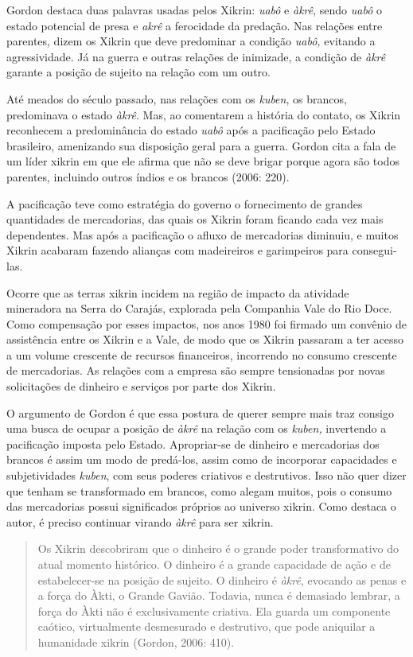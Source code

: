 Gordon destaca duas palavras usadas pelos Xikrin: \emph{uabô} e
\emph{àkrê}, sendo \emph{uabô} o estado potencial de presa e \emph{akrê}
a ferocidade da predação. Nas relações entre parentes, dizem os Xikrin
que deve predominar a condição \emph{uabô,} evitando a agressividade. Já
na guerra e outras relações de inimizade, a condição de \emph{àkrê}
garante a posição de sujeito na relação com um outro.

Até meados do século passado, nas relações com os \emph{kuben}, os
brancos, predominava o estado \emph{àkrê}. Mas, ao comentarem a história
do contato, os Xikrin reconhecem a predominância do estado \emph{uabô}
após a pacificação pelo Estado brasileiro, amenizando sua disposição
geral para a guerra. Gordon cita a fala de um líder xikrin em que ele
afirma que não se deve brigar porque agora são todos parentes, incluindo
outros índios e os brancos (2006: 220).

A pacificação teve como estratégia do governo o fornecimento de grandes
quantidades de mercadorias, das quais os Xikrin foram ficando cada vez
mais dependentes. Mas após a pacificação o afluxo de mercadorias
diminuiu, e muitos Xikrin acabaram fazendo alianças com madeireiros e
garimpeiros para consegui-las.

Ocorre que as terras xikrin incidem na região de impacto da atividade
mineradora na Serra do Carajás, explorada pela Companhia Vale do Rio
Doce. Como compensação por esses impactos, nos anos 1980 foi firmado um
convênio de assistência entre os Xikrin e a Vale, de modo que os Xikrin
passaram a ter acesso a um volume crescente de recursos financeiros,
incorrendo no consumo crescente de mercadorias. As relações com a
empresa são sempre tensionadas por novas solicitações de dinheiro e
serviços por parte dos Xikrin.

O argumento de Gordon é que essa postura de querer sempre mais traz
consigo uma busca de ocupar a posição de \emph{àkrê} na relação com os
\emph{kuben,} invertendo a pacificação imposta pelo Estado. Apropriar-se
de dinheiro e mercadorias dos brancos é assim um modo de predá-los,
assim como de incorporar capacidades e subjetividades \emph{kuben}, com
seus poderes criativos e destrutivos. Isso não quer dizer que tenham se
transformado em brancos, como alegam muitos, pois o consumo das
mercadorias possui significados próprios ao universo xikrin. Como
destaca o autor, é preciso continuar virando \emph{àkrê} para ser
xikrin.

\begin{quote}
Os Xikrin descobriram que o dinheiro é o grande poder transformativo do
atual momento histórico. O dinheiro é a grande capacidade de ação e de
estabelecer-se na posição de sujeito. O dinheiro é \emph{àkrê}, evocando
as penas e a força do Àkti, o Grande Gavião. Todavia, nunca é demasiado
lembrar, a força do Àkti não é exclusivamente criativa. Ela guarda um
componente caótico, virtualmente desmesurado e destrutivo, que pode
aniquilar a humanidade xikrin (Gordon, 2006: 410).
\end{quote}

